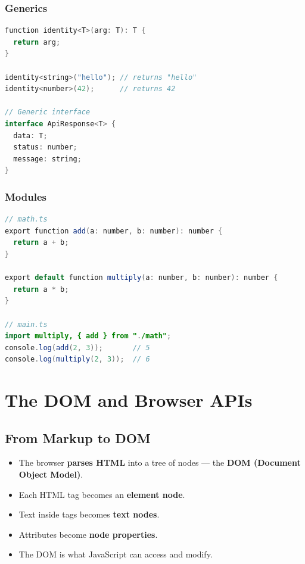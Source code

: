 \documentclass[hidelinks]{article}
\begin{document}
\subsubsection{Generics}
\begin{lstlisting}[language=Java, caption={TypeScript generics}]
function identity<T>(arg: T): T {
  return arg;
}

identity<string>("hello"); // returns "hello"
identity<number>(42);      // returns 42

// Generic interface
interface ApiResponse<T> {
  data: T;
  status: number;
  message: string;
}
\end{lstlisting}

\subsubsection{Modules}
\begin{lstlisting}[language=Java, caption={ES module exports and imports in TypeScript}]
// math.ts
export function add(a: number, b: number): number {
  return a + b;
}

export default function multiply(a: number, b: number): number {
  return a * b;
}

// main.ts
import multiply, { add } from "./math";
console.log(add(2, 3));       // 5
console.log(multiply(2, 3));  // 6
\end{lstlisting}

\newpage
\section{The DOM and Browser APIs}

\subsection{From Markup to DOM}
\begin{itemize}
  \item The browser \textbf{parses HTML} into a tree of nodes --- the \textbf{DOM (Document Object Model)}.
  \item Each HTML tag becomes an \textbf{element node}.
  \item Text inside tags becomes \textbf{text nodes}.
  \item Attributes become \textbf{node properties}.
  \item The DOM is what JavaScript can access and modify.
\end{itemize}
\end{document}
